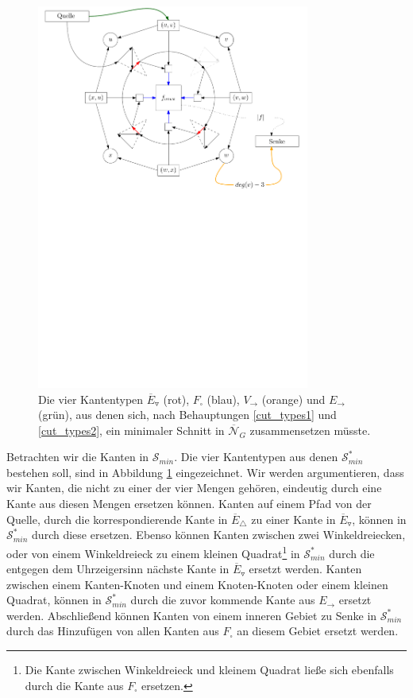 \begin{figure}
	\centering
  	\includegraphics[width=0.8\textwidth]{face_cut.pdf}
  	\caption{Die vier Kantentypen $\overline{E}_\triangledown$ (rot), $F_\square$ (blau), $V_\to$ (orange) und $E_\to$ (grün), aus denen sich, nach Behauptungen \ref{cut_types1} und \ref{cut_types2}, ein minimaler Schnitt in $\overline{\mathcal{N}}_G$ zusammensetzen müsste.}
	\label{cut_edges}
\end{figure}

Betrachten wir die Kanten in $\mathcal{S}_{min}$. Die vier Kantentypen aus denen $\mathcal{S}_{min}^*$ bestehen soll, sind in Abbildung \ref{cut_edges} eingezeichnet. Wir werden argumentieren, dass wir Kanten, die nicht zu einer der vier Mengen gehören, eindeutig durch eine Kante aus diesen Mengen ersetzen können. Kanten auf einem Pfad von der Quelle, durch die korrespondierende Kante in $\overline{E}_\triangle$ zu einer Kante in $\overline{E}_\triangledown$, können in $\mathcal{S}_{min}^*$ durch diese ersetzen. Ebenso können Kanten zwischen zwei Winkeldreiecken, oder von einem Winkeldreieck zu einem kleinen Quadrat\footnote{Die Kante zwischen Winkeldreieck und kleinem Quadrat ließe sich ebenfalls durch die Kante aus $F_\square$ ersetzen.} in $\mathcal{S}_{min}^*$ durch die entgegen dem Uhrzeigersinn nächste Kante in $\overline{E}_\triangledown$ ersetzt werden. Kanten zwischen einem Kanten-Knoten und einem Knoten-Knoten oder einem kleinen Quadrat, können in $\mathcal{S}_{min}^*$ durch die zuvor kommende Kante aus $E_\to$ ersetzt werden. Abschließend können Kanten von einem inneren Gebiet zu Senke in $\mathcal{S}_{min}^*$ durch das Hinzufügen von allen Kanten aus $F_\square$ an diesem Gebiet ersetzt werden.

